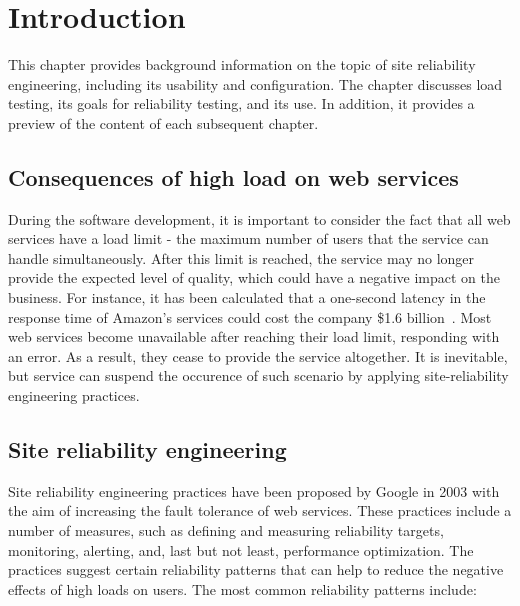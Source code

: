 \chapter{Introduction}
\label{ch:intro}

This chapter provides background information on the topic of site reliability engineering, including its usability and configuration. The chapter discusses load testing, its goals for reliability testing, and its use. In addition, it provides a preview of the content of each subsequent chapter.

\section{Consequences of high load on web services}\label{sec:consequences-of-high-load-on-web-services}
During the software development, it is important to consider the fact that all web services have a load limit - the maximum number of users that the service can handle simultaneously. After this limit is reached, the service may no longer provide the expected level of quality, which could have a negative impact on the business. For instance, it has been calculated that a one-second latency in the response time of Amazon's services could cost the company \$1.6 billion~\cite{one_second_article}.
Most web services become unavailable after reaching their load limit, responding with an error. As a result, they cease to provide the service altogether. It is inevitable, but service can suspend the occurence of such scenario by applying site-reliability engineering practices.

\section{Site reliability engineering}\label{sec:site-reliability-engineering}
Site reliability engineering practices have been proposed by Google in 2003 with the aim of increasing the fault tolerance of web services. These practices include a number of measures, such as defining and measuring reliability targets, monitoring, alerting, and, last but not least, performance optimization. The practices suggest certain reliability patterns that can help to reduce the negative effects of high loads on users.
The most common reliability patterns include:

